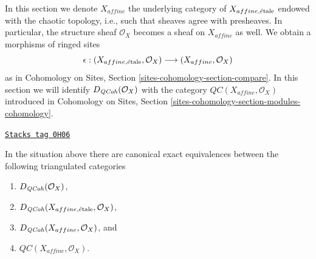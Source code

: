 \medskip\noindent
In this section we denote $X_{affine}$ the underlying category of
$X_{affine, \acute{e}\text{tale}}$ endowed with the chaotic topology, i.e., such that sheaves
agree with presheaves. In particular, the structure sheaf $\mathcal{O}_X$
becomes a sheaf on $X_{affine}$ as well.
We obtain a morphisms of ringed sites
$$
\epsilon :
(X_{affine, \acute{e}\text{tale}}, \mathcal{O}_X)
\longrightarrow
(X_{affine}, \mathcal{O}_X)
$$
as in Cohomology on Sites, Section \ref{sites-cohomology-section-compare}.
In this section we will identify $D_{\mathit{QCoh}}(\mathcal{O}_X)$ with
the category $\mathit{QC}(X_{affine}, \mathcal{O}_X)$ introduced in
Cohomology on Sites, Section \ref{sites-cohomology-section-modules-cohomology}.

\begin{lemma}
\label{spaces-perfect-lemma-DQCoh-alternative-small}
\href{https://stacks.math.columbia.edu/tag/0H06}{\texttt{Stacks tag 0H06}}

In the situation above there are canonical exact equivalences between
the following triangulated categories
\begin{enumerate}
\item $D_{\mathit{QCoh}}(\mathcal{O}_X)$,
\item $D_{\mathit{QCoh}}(X_{affine, \acute{e}\text{tale}}, \mathcal{O}_X)$,
\item $D_{\mathit{QCoh}}(X_{affine}, \mathcal{O}_X)$, and
\item $\mathit{QC}(X_{affine}, \mathcal{O}_X)$.
\end{enumerate}
\end{lemma}

